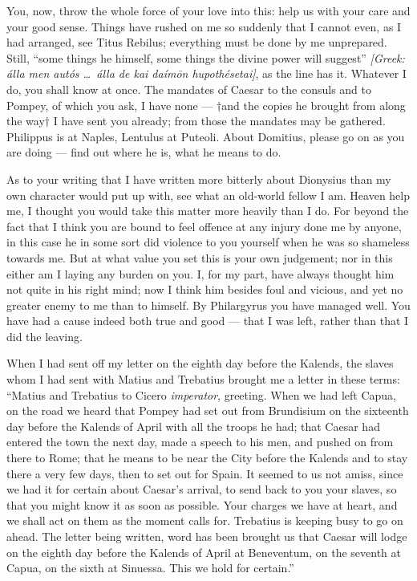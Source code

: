  You, now, throw the whole force of your love into this: help us with your care and your good sense. Things have rushed on me so suddenly that I cannot even, as I had arranged, see Titus Rebilus; everything must be done by me unprepared. Still, ``some things he himself, some things the divine power will suggest'' \textit{[Greek: \'alla men aut\'os \ldots\ \'alla de kai da\'im\=on hupoth\'esetai]}, as the line has it. Whatever I do, you shall know at once. The mandates of Caesar to the consuls and to Pompey, of which you ask, I have none --- $\dagger$and the copies he brought from along the way$\dagger$ I have sent you already; from those the mandates may be gathered. Philippus is at Naples, Lentulus at Puteoli. About Domitius, please go on as you are doing --- find out where he is, what he means to do.

 As to your writing that I have written more bitterly about Dionysius than my own character would put up with, see what an old-world fellow I am. Heaven help me, I thought you would take this matter more heavily than I do. For beyond the fact that I think you are bound to feel offence at any injury done me by anyone, in this case he in some sort did violence to you yourself when he was so shameless towards me. But at what value you set this is your own judgement; nor in this either am I laying any burden on you. I, for my part, have always thought him not quite in his right mind; now I think him besides foul and vicious, and yet no greater enemy to me than to himself. By Philargyrus you have managed well. You have had a cause indeed both true and good --- that I was left, rather than that I did the leaving.

 When I had sent off my letter on the eighth day before the Kalends, the slaves whom I had sent with Matius and Trebatius brought me a letter in these terms: ``Matius and Trebatius to Cicero \textit{imperator}, greeting. When we had left Capua, on the road we heard that Pompey had set out from Brundisium on the sixteenth day before the Kalends of April with all the troops he had; that Caesar had entered the town the next day, made a speech to his men, and pushed on from there to Rome; that he means to be near the City before the Kalends and to stay there a very few days, then to set out for Spain. It seemed to us not amiss, since we had it for certain about Caesar's arrival, to send back to you your slaves, so that you might know it as soon as possible. Your charges we have at heart, and we shall act on them as the moment calls for. Trebatius is keeping busy to go on ahead. The letter being written, word has been brought us that Caesar will lodge on the eighth day before the Kalends of April at Beneventum, on the seventh at Capua, on the sixth at Sinuessa. This we hold for certain.''
